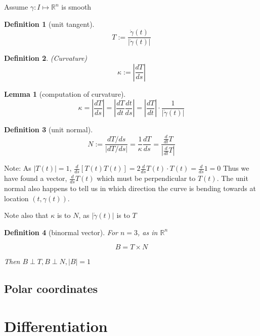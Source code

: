 \documentclass{article}
\theoremstyle{plain}
\newtheorem{definition}{Definition}
\newtheorem{lemma}{Lemma}
\begin{document}
Assume $\gamma : I \mapsto \mathbb R ^n$ is smooth

\begin{definition}[unit tangent]
    $$T:= \frac{\dot \gamma(t)}{|\dot \gamma(t)|}$$
    
\end{definition}

\begin{definition}(Curvature)
    $$ \kappa := |\frac{dT}{ds}|$$
    
\end{definition}

\begin{lemma}[computation of curvature]
    $$\kappa = |\frac{dT}{ds}| = |\frac{dT}{dt} \frac{dt}{ds}| = |\frac{dT}{dt} | \cdot \frac{1}{|\dot \gamma(t)|}$$
\end{lemma}

\begin{definition}[unit normal]
    $$N:= \frac{dT / ds}{|dT / ds|} = \frac{1}{\kappa} \frac{dT}{ds} = \frac{\frac{d}{dt}T}{|\frac{d}{dt}T|}$$

    
\end{definition}

Note: As $|T(t)| = 1$, 
$\frac{d}{ds} [T(t) T(t)] = 2 \frac{d}{ds} T(t) \cdot T(t) = \frac{d}{ds} 1 = 0$
Thus we have found a vector, $\frac{d}{ds} T(t)$ which must be perpendicular to $T(t)$.
The unit normal also happens to tell us in which direction the
curve is bending towards at location $(t, \gamma(t))$.

Note also that $\kappa$ is to $N$, as $|\dot \gamma(t)|$ is to $T$

\begin{definition}[binormal vector]
    For $n = 3$, as in $\mathbb R ^n$

    $$B = T \times N$$

    Then $B \perp T, B \perp N, |B| = 1$
    
\end{definition}





\subsection{Polar coordinates}





\section{Differentiation}
\end{document}
